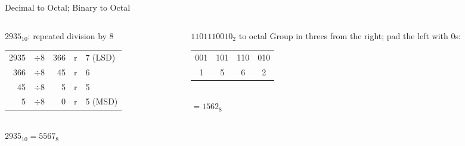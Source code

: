 \documentclass[9pt,aspectratio=169,xcolor=table]{beamer}
\begin{document}
\begin{frame}{Decimal to Octal; Binary to Octal}
  \begin{columns}[t]
  \begin{column}{.5\textwidth}
    \begin{block}{$2935_{10}$: repeated division by 8}
      \small
      \begin{tabular}{rcrcl}
        2935 & $\div 8$ & 366 & r & 7 (LSD) \\
        366 & $\div 8$ & 45 & r & 6 \\
        45 & $\div 8$ & 5 & r & 5 \\
        5 & $\div 8$ & 0 & r & 5 (MSD) \\
      \end{tabular}\\[1mm]
      $2935_{10} = 5567_8$
    \end{block}
  \end{column}
  \begin{column}{.48\textwidth}
    \begin{block}{$1101110010_2$ to octal}
      \small Group in threes from the right; pad the left with 0s:\\[1mm]
      \centering
      \begin{tabular}{cccc}
        001 & 101 & 110 & 010 \\
        1 & 5 & 6 & 2 \\
      \end{tabular}\\[1mm]
      $= 1562_8$
    \end{block}
  \end{column}
  \end{columns}
\end{frame}
\end{document}
